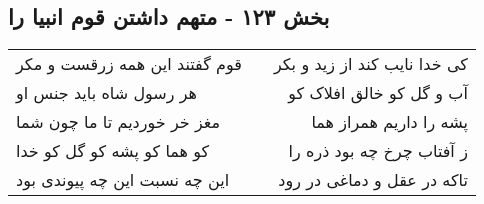 \begin{center}
\section*{بخش ۱۲۳ - متهم داشتن قوم انبیا را}
\label{sec:sh123}
\begin{longtable}{l p{0.5cm} r}
قوم گفتند این همه زرقست و مکر
&&
کی خدا نایب کند از زید و بکر
\\
هر رسول شاه باید جنس او
&&
آب و گل کو خالق افلاک کو
\\
مغز خر خوردیم تا ما چون شما
&&
پشه را داریم همراز هما
\\
کو هما کو پشه کو گل کو خدا
&&
ز آفتاب چرخ چه بود ذره را
\\
این چه نسبت این چه پیوندی بود
&&
تاکه در عقل و دماغی در رود
\\
\end{longtable}
\end{center}
